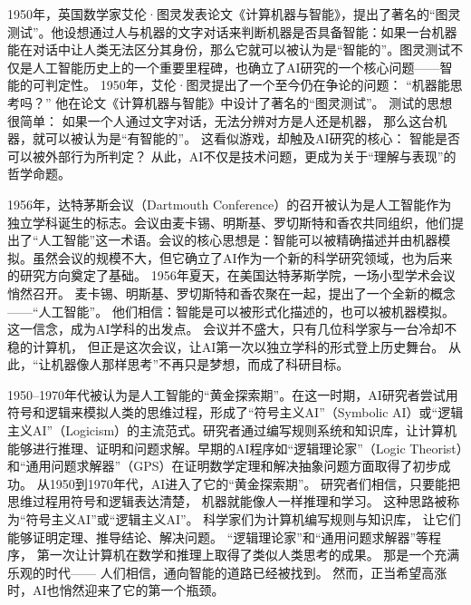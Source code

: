 1950年，英国数学家艾伦·图灵发表论文《计算机器与智能》，提出了著名的“图灵测试”。他设想通过人与机器的文字对话来判断机器是否具备智能：如果一台机器能在对话中让人类无法区分其身份，那么它就可以被认为是“智能的”。图灵测试不仅是人工智能历史上的一个重要里程碑，也确立了AI研究的一个核心问题——智能的可判定性。
1950年，艾伦·图灵提出了一个至今仍在争论的问题：  
“机器能思考吗？”  
他在论文《计算机器与智能》中设计了著名的“图灵测试”。  
测试的思想很简单：  
如果一个人通过文字对话，无法分辨对方是人还是机器，  
那么这台机器，就可以被认为是“有智能的”。  
这看似游戏，却触及AI研究的核心：  
智能是否可以被外部行为所判定？  
从此，AI不仅是技术问题，更成为关于“理解与表现”的哲学命题。  

1956年，达特茅斯会议（Dartmouth Conference）的召开被认为是人工智能作为独立学科诞生的标志。会议由麦卡锡、明斯基、罗切斯特和香农共同组织，他们提出了“人工智能”这一术语。会议的核心思想是：智能可以被精确描述并由机器模拟。虽然会议的规模不大，但它确立了AI作为一个新的科学研究领域，也为后来的研究方向奠定了基础。
1956年夏天，在美国达特茅斯学院，一场小型学术会议悄然召开。  
麦卡锡、明斯基、罗切斯特和香农聚在一起，提出了一个全新的概念——“人工智能”。  
他们相信：智能是可以被形式化描述的，也可以被机器模拟。  
这一信念，成为AI学科的出发点。  
会议并不盛大，只有几位科学家与一台冷却不稳的计算机，  
但正是这次会议，让AI第一次以独立学科的形式登上历史舞台。  
从此，“让机器像人那样思考”不再只是梦想，而成了科研目标。  

1950–1970年代被认为是人工智能的“黄金探索期”。在这一时期，AI研究者尝试用符号和逻辑来模拟人类的思维过程，形成了“符号主义AI”（Symbolic AI）或“逻辑主义AI”（Logicism）的主流范式。研究者通过编写规则系统和知识库，让计算机能够进行推理、证明和问题求解。早期的AI程序如“逻辑理论家”（Logic Theorist）和“通用问题求解器”（GPS）在证明数学定理和解决抽象问题方面取得了初步成功。
从1950到1970年代，AI进入了它的“黄金探索期”。  
研究者们相信，只要能把思维过程用符号和逻辑表达清楚，  
机器就能像人一样推理和学习。  
这种思路被称为“符号主义AI”或“逻辑主义AI”。  
科学家们为计算机编写规则与知识库，  
让它们能够证明定理、推导结论、解决问题。  
“逻辑理论家”和“通用问题求解器”等程序，  
第一次让计算机在数学和推理上取得了类似人类思考的成果。  
那是一个充满乐观的时代——  
人们相信，通向智能的道路已经被找到。  
然而，正当希望高涨时，AI也悄然迎来了它的第一个瓶颈。  

